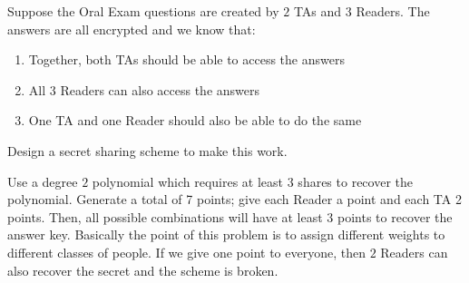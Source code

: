\question Suppose the Oral Exam questions are created by $2$ TAs 
and $3$ Readers. The answers are all encrypted and we know that:

\begin{enumerate}[label=(\alph*)]
\item Together, both TAs should be able to access the answers
\item All 3 Readers can also access the answers
\item One TA and one Reader should also be able to do the same
\end{enumerate}

Design a secret sharing scheme to make this work.

\begin{solution}[1 in]
Use a degree $2$ polynomial which requires at least $3$ shares to 
recover the polynomial. Generate a total of 7 points; give each Reader 
a point and each TA 2 points. Then, all possible combinations will 
have at least $3$ points to recover the answer key. Basically the point 
of this problem is to assign different weights to different classes of 
people. If we give one point to everyone, then $2$ Readers can also 
recover the secret and the scheme is broken.
\end{solution}
